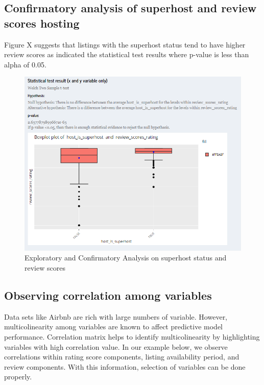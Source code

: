 \documentclass{acm_proc_article-sp}
\begin{document}
\hypertarget{confirmatory-analysis-of-superhost-and-review-scores-hosting}{%
\subsection{Confirmatory analysis of superhost and review scores
hosting}\label{confirmatory-analysis-of-superhost-and-review-scores-hosting}}

Figure X suggests that listings with the superhost status tend to have
higher review scores as indicated the statistical test results where
p-value is less than alpha of 0.05.

\begin{figure}[H]

{\centering \includegraphics[width=1\linewidth]{images/usecase_explore4} 

}

\caption{Exploratory and Confirmatory Analysis on superhost status and review scores}\label{fig:unnamed-chunk-19}
\end{figure}

\hypertarget{observing-correlation-among-variables}{%
\subsection{Observing correlation among
variables}\label{observing-correlation-among-variables}}

Data sets like Airbnb are rich with large numbers of variable. However,
multicolinearity among variables are known to affect predictive model
performance. Correlation matrix helps to identify multicolinearity by
highlighting variables with high correlation value. In our example
below, we observe correlations within rating score components, listing
availability period, and review components. With this information,
selection of variables can be done properly.
\end{document}
